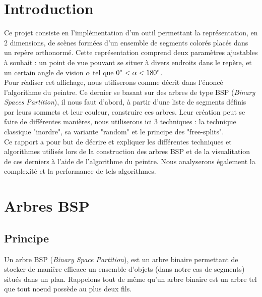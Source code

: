 \documentclass[11pt,a4paper]{article}
\begin{document}
\tableofcontents
\newpage

\section*{Introduction}
Ce projet consiste en l'implémentation d'un outil permettant la représentation, en 2 dimensions, de scènes formées d'un ensemble de segments colorés placés dans un repère orthonormé. Cette représentation comprend deux paramètres ajustables à souhait : un point de vue pouvant se situer à divers endroits dans le repère, et un certain angle de vision $\alpha$ tel que $0 \degree <\alpha<180 \degree$.\\

Pour réaliser cet affichage, nous utiliserons comme décrit dans l'énoncé l'algorithme du peintre. Ce dernier se basant sur des arbres de type BSP (\emph{Binary Spaces Partition}), il nous faut d'abord, à partir d'une liste de segments définis par leurs sommets et leur couleur, construire ces arbres. Leur création peut se faire de différentes manières, nous utiliserons ici 3 techniques : la technique classique "inordre", sa variante "random" et le principe des "free-splits". \\

Ce rapport a pour but de décrire et expliquer les différentes techniques et algorithmes utilisés lors de la construction des arbres BSP et de la visualitation de ces derniers à l'aide de l'algorithme du peintre. Nous analyserons également la complexité et la performance de tels algorithmes.

\newpage

\section{Arbres BSP}
\subsection{Principe}
Un arbre BSP (\emph{Binary Space Partition}), est un arbre binaire permettant de stocker de manière efficace un ensemble d'objets (dans notre cas de segments) situés dans un plan. Rappelons tout de même qu'un arbre binaire est un arbre tel que tout noeud possède au plus deux fils. \\
\end{document}
